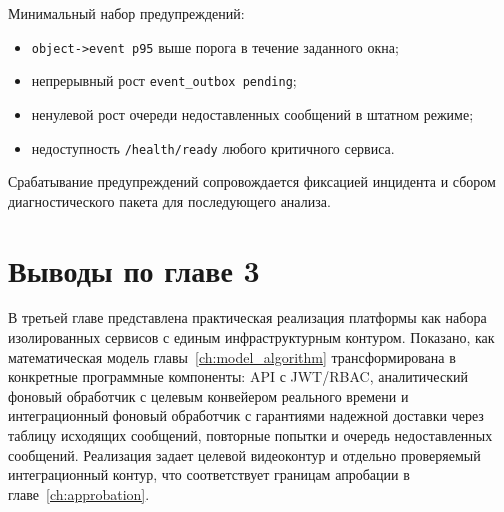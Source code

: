 Минимальный набор предупреждений:
\begin{itemize}
    \item \texttt{object->event p95} выше порога в течение заданного окна;
    \item непрерывный рост \texttt{event\_outbox pending};
    \item ненулевой рост очереди недоставленных сообщений в штатном режиме;
    \item недоступность \texttt{/health/ready} любого критичного сервиса.
\end{itemize}

Срабатывание предупреждений сопровождается фиксацией инцидента и сбором диагностического пакета для последующего анализа.

\section*{Выводы по главе 3}

В третьей главе представлена практическая реализация платформы как набора изолированных сервисов с единым инфраструктурным контуром. Показано, как математическая модель главы~\ref{ch:model_algorithm} трансформирована в конкретные программные компоненты: API с JWT/RBAC, аналитический фоновый обработчик с целевым конвейером реального времени и интеграционный фоновый обработчик с гарантиями надежной доставки через таблицу исходящих сообщений, повторные попытки и очередь недоставленных сообщений. Реализация задает целевой видеоконтур и отдельно проверяемый интеграционный контур, что соответствует границам апробации в главе~\ref{ch:approbation}.
